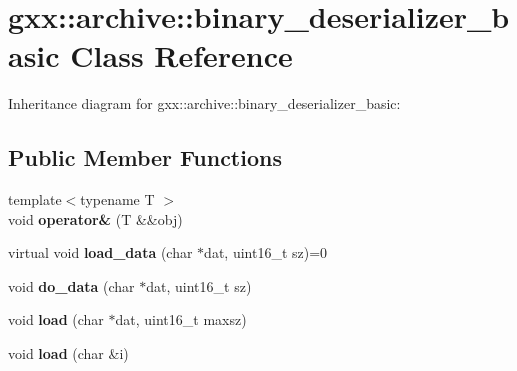 \hypertarget{classgxx_1_1archive_1_1binary__deserializer__basic}{}\section{gxx\+:\+:archive\+:\+:binary\+\_\+deserializer\+\_\+basic Class Reference}
\label{classgxx_1_1archive_1_1binary__deserializer__basic}


Inheritance diagram for gxx\+:\+:archive\+:\+:binary\+\_\+deserializer\+\_\+basic\+:
\subsection*{Public Member Functions}
\begin{DoxyCompactItemize}
\item 
{\footnotesize template$<$typename T $>$ }\\void {\bfseries operator\&} (T \&\&obj)\hypertarget{classgxx_1_1archive_1_1binary__deserializer__basic_a5bf9567e3c11621c442b0fb4f00a46b1}{}\label{classgxx_1_1archive_1_1binary__deserializer__basic_a5bf9567e3c11621c442b0fb4f00a46b1}

\item 
virtual void {\bfseries load\+\_\+data} (char $\ast$dat, uint16\+\_\+t sz)=0\hypertarget{classgxx_1_1archive_1_1binary__deserializer__basic_aabcb28260ba2724420125e3b397b5ce7}{}\label{classgxx_1_1archive_1_1binary__deserializer__basic_aabcb28260ba2724420125e3b397b5ce7}

\item 
void {\bfseries do\+\_\+data} (char $\ast$dat, uint16\+\_\+t sz)\hypertarget{classgxx_1_1archive_1_1binary__deserializer__basic_adee825c6ee4e1f532a82feb183cd54a8}{}\label{classgxx_1_1archive_1_1binary__deserializer__basic_adee825c6ee4e1f532a82feb183cd54a8}

\item 
void {\bfseries load} (char $\ast$dat, uint16\+\_\+t maxsz)\hypertarget{classgxx_1_1archive_1_1binary__deserializer__basic_aa528759587f412e22f7e8cd023e4adf0}{}\label{classgxx_1_1archive_1_1binary__deserializer__basic_aa528759587f412e22f7e8cd023e4adf0}

\item 
void {\bfseries load} (char \&i)\hypertarget{classgxx_1_1archive_1_1binary__deserializer__basic_a0835910d47a138f8bf64f7928afec0fa}{}\label{classgxx_1_1archive_1_1binary__deserializer__basic_a0835910d47a138f8bf64f7928afec0fa}


\end{DoxyCompactItemize}
